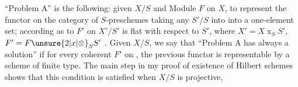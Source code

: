 ``Problem A'' is the following: given $X/S$ and  Module $F$ on $X$, to represent the functor on the category of $S$-preschemes taking any $S'/S$ into  into a one-element  set; according as to  $F'$ on $X'/S'$ is flat with respect to $S'$, where $X'=X\mathbin{x}_S S'$, $F'=F\unsure{2|x|\otimes}_S S'$ . Given $X/S$, we say that ``Problem A  has always a solution'' if for every coherent $F'$ on , the previous functor  is representable by a scheme of finite type. The main step in my proof of existence of Hilbert schemes shows that this condition is satisfied when $X/S$ is projective,
